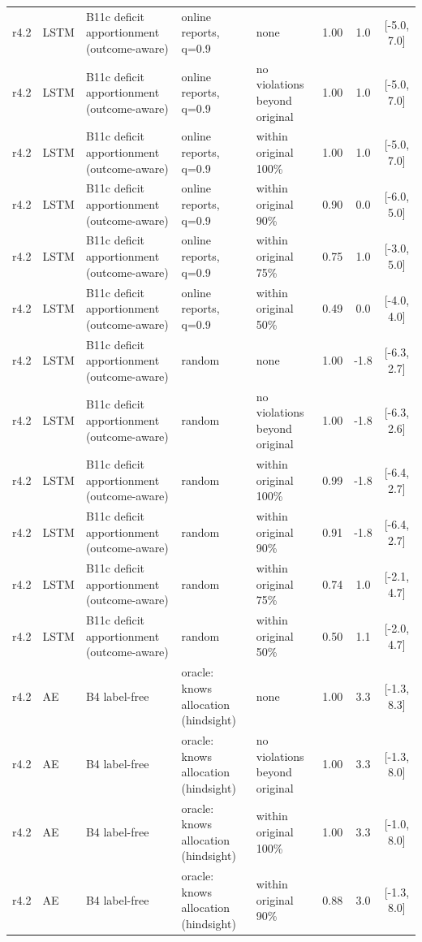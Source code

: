 \begin{longtable}{lllp{4.2cm}p{3.4cm}ccc}
r4.2 & LSTM & B11c deficit apportionment (outcome-aware) & online reports, q=0.9 & none & 1.00 & 1.0 & [-5.0, 7.0] \\
r4.2 & LSTM & B11c deficit apportionment (outcome-aware) & online reports, q=0.9 & no violations beyond original & 1.00 & 1.0 & [-5.0, 7.0] \\
r4.2 & LSTM & B11c deficit apportionment (outcome-aware) & online reports, q=0.9 & within original 100\% & 1.00 & 1.0 & [-5.0, 7.0] \\
r4.2 & LSTM & B11c deficit apportionment (outcome-aware) & online reports, q=0.9 & within original 90\% & 0.90 & 0.0 & [-6.0, 5.0] \\
r4.2 & LSTM & B11c deficit apportionment (outcome-aware) & online reports, q=0.9 & within original 75\% & 0.75 & 1.0 & [-3.0, 5.0] \\
r4.2 & LSTM & B11c deficit apportionment (outcome-aware) & online reports, q=0.9 & within original 50\% & 0.49 & 0.0 & [-4.0, 4.0] \\
r4.2 & LSTM & B11c deficit apportionment (outcome-aware) & random & none & 1.00 & -1.8 & [-6.3, 2.7] \\
r4.2 & LSTM & B11c deficit apportionment (outcome-aware) & random & no violations beyond original & 1.00 & -1.8 & [-6.3, 2.6] \\
r4.2 & LSTM & B11c deficit apportionment (outcome-aware) & random & within original 100\% & 0.99 & -1.8 & [-6.4, 2.7] \\
r4.2 & LSTM & B11c deficit apportionment (outcome-aware) & random & within original 90\% & 0.91 & -1.8 & [-6.4, 2.7] \\
r4.2 & LSTM & B11c deficit apportionment (outcome-aware) & random & within original 75\% & 0.74 & 1.0 & [-2.1, 4.7] \\
r4.2 & LSTM & B11c deficit apportionment (outcome-aware) & random & within original 50\% & 0.50 & 1.1 & [-2.0, 4.7] \\
r4.2 & AE & B4 label-free & oracle: knows allocation (hindsight) & none & 1.00 & 3.3 & [-1.3, 8.3] \\
r4.2 & AE & B4 label-free & oracle: knows allocation (hindsight) & no violations beyond original & 1.00 & 3.3 & [-1.3, 8.0] \\
r4.2 & AE & B4 label-free & oracle: knows allocation (hindsight) & within original 100\% & 1.00 & 3.3 & [-1.0, 8.0] \\
r4.2 & AE & B4 label-free & oracle: knows allocation (hindsight) & within original 90\% & 0.88 & 3.0 & [-1.3, 8.0] \\

\end{longtable}
